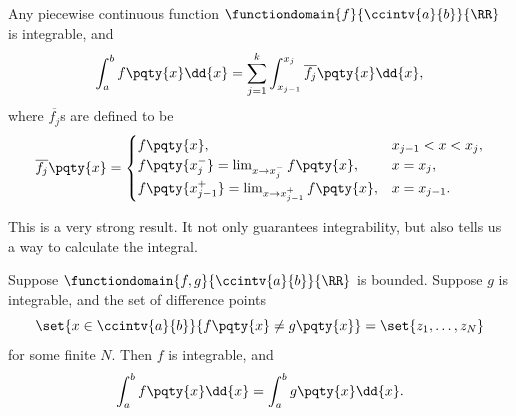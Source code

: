 \begin{proposition}
    \label{prop:piecewise-continuous-integrable}%
    Any piecewise continuous function \(\functiondomain{f}{\ccintv{a}{b}}{\RR}\) is integrable, and
    \[
        \int_{a}^{b} f\pqty{x} \dd{x} = \sum_{j = 1}^{k} \int_{x_{j - 1}}^{x_j} \overline{f_j} \pqty{x} \dd{x},
    \]
    where \(\overline{f_j}\)s are defined to be
    \[
        \overline{f_j} \pqty{x} = \begin{cases}
            f\pqty{x}, & x_{j - 1} < x < x_j, \\
            f\pqty{x_j^{-}} = \lim_{x \to x_j^{-}} f\pqty{x}, & x = x_j, \\
            f\pqty{x_{j - 1}^{+}} = \lim_{x \to x_{j - 1}^{+}} f\pqty{x}, & x = x_{j - 1}.
        \end{cases}
    \]
\end{proposition}

This is a very strong result. It not only guarantees integrability, but also tells us a way to calculate the integral.

\begin{lemma}
    \label{lem:individual-points-retains-integrable}%
    Suppose \(\functiondomain{f, g}{\ccintv{a}{b}}{\RR}\) is bounded. Suppose \(g\) is integrable, and the set of difference points
    \[
        \set{x \in \ccintv{a}{b}}{f\pqty{x} \neq g\pqty{x}} = \set{z_1, \ldots, z_N}
    \]
    for some finite \(N\). Then \(f\) is integrable, and
    \[
        \int_{a}^{b} f\pqty{x} \dd{x} = \int_{a}^{b} g\pqty{x} \dd{x}.
    \]
\end{lemma}

